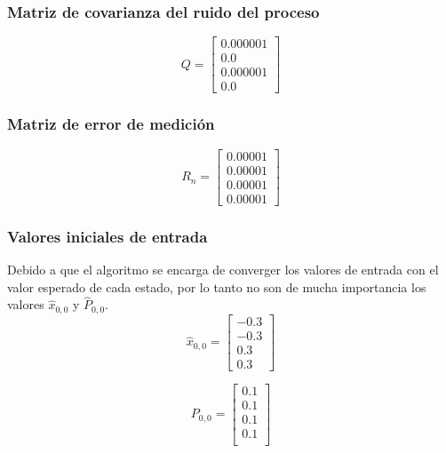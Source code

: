 		\subsubsection*{Matriz de covarianza del ruido del proceso}
\begin{equation}
Q = \begin{bmatrix}
0.000001	\\ 
0.0\\ 
0.000001\\ 
0.0
\end{bmatrix}
\label{eq:process_noise_matrix}
\end{equation}

		\subsubsection*{Matriz de error de medición}
\begin{equation}
R_n = \begin{bmatrix}
0.00001	\\ 
0.00001\\ 
0.00001\\ 
0.00001
\end{bmatrix}
\label{eq:noise_measurement}
\end{equation}

		\subsubsection*{Valores iniciales de entrada}
		Debido a que el algoritmo se encarga de converger los valores de entrada con el valor esperado de cada estado, por lo tanto no son de mucha importancia los valores $\hat{x}_{0,0}$ y $\hat{P}_{0,0}$.
\begin{equation}
\hat{x}_{0,0} = \begin{bmatrix}
-0.3\\ 
-0.3\\ 
0.3\\ 
0.3
\end{bmatrix}
\label{eq:initial_state_vector}
\end{equation}

\begin{equation}
P_{0,0} 
=
\begin{bmatrix}
0.1 \\ 
0.1 \\
0.1 \\
0.1 \\
\end{bmatrix}
\label{eq:initial_cov_vector}
\end{equation}	